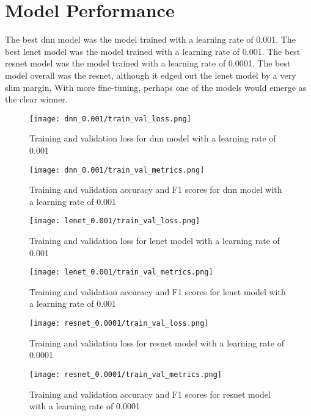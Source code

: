 \documentclass{article}
\begin{document}
\section{Model Performance}

The best dnn model was the model trained with a learning rate of 0.001. The best
lenet model was the model trained with a learning rate of 0.001. The best resnet model
was the model trained with a learning rate of 0.0001. The best model overall was
the resnet, although it edged out the lenet model by a very slim margin. With more
fine-tuning, perhaps one of the models would emerge as the clear winner.

\begin{figure}[h]
    \centering
    \texttt{[image: dnn\_0.001/train\_val\_loss.png]}
    \caption{Training and validation loss for dnn model with a learning rate of 0.001}
    \label{fig:dnn_0.001_loss}
\end{figure}

\begin{figure}[h]
    \centering
    \texttt{[image: dnn\_0.001/train\_val\_metrics.png]}
    \caption{Training and validation accuracy and F1 scores for dnn model with a learning rate of 0.001}
    \label{fig:dnn_0.001_metrics}
\end{figure}

\begin{figure}[h]
    \centering
    \texttt{[image: lenet\_0.001/train\_val\_loss.png]}
    \caption{Training and validation loss for lenet model with a learning rate of 0.001}
    \label{fig:lenet_0.001_loss}
\end{figure}

\begin{figure}[h]
    \centering
    \texttt{[image: lenet\_0.001/train\_val\_metrics.png]}
    \caption{Training and validation accuracy and F1 scores for lenet model with a learning rate of 0.001}
    \label{fig:lenet_0.001_metrics}
\end{figure}

\begin{figure}[h]
    \centering
    \texttt{[image: resnet\_0.0001/train\_val\_loss.png]}
    \caption{Training and validation loss for resnet model with a learning rate of 0.0001}
    \label{fig:resnet_0.0001_loss}
\end{figure}

\begin{figure}[h]
    \centering
    \texttt{[image: resnet\_0.0001/train\_val\_metrics.png]}
    \caption{Training and validation accuracy and F1 scores for resnet model with a learning rate of 0.0001}
    \label{fig:resnet_0.0001_metrics}
\end{figure}
\end{document}

